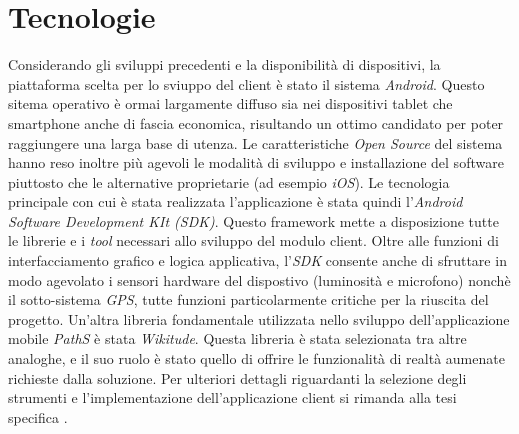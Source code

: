 \section{Tecnologie}
Considerando gli sviluppi precedenti e la disponibilità di dispositivi, la piattaforma scelta per lo sviuppo del client è stato il sistema \emph{Android}. Questo sitema operativo è ormai largamente diffuso sia nei dispositivi tablet che smartphone anche di fascia economica, risultando un ottimo candidato per poter raggiungere una larga base di utenza. Le caratteristiche \emph{Open Source} del sistema hanno reso inoltre più agevoli le modalità di sviluppo e installazione del software piuttosto che le alternative proprietarie (ad esempio \emph{iOS}).
Le tecnologia principale con cui è stata realizzata l'applicazione è stata quindi l'\emph{Android Software Development KIt (SDK)}. Questo framework mette a disposizione tutte le librerie e i \emph{tool} necessari allo sviluppo del modulo client. Oltre alle funzioni di interfacciamento grafico e logica applicativa, l'\emph{SDK} consente anche di sfruttare in modo agevolato i sensori hardware del dispostivo (luminosità e microfono) nonchè il sotto-sistema \emph{GPS}, tutte funzioni particolarmente critiche per la riuscita del progetto.
Un'altra libreria fondamentale utilizzata nello sviluppo dell'applicazione mobile \emph{PathS} è stata \emph{Wikitude}. Questa libreria è stata selezionata tra altre analoghe, e il suo ruolo è stato quello di offrire le funzionalità di realtà aumenate richieste dalla soluzione. 
Per ulteriori dettagli riguardanti la selezione degli strumenti e l'implementazione dell'applicazione client si rimanda alla tesi specifica \cite{tesitombolini}.

